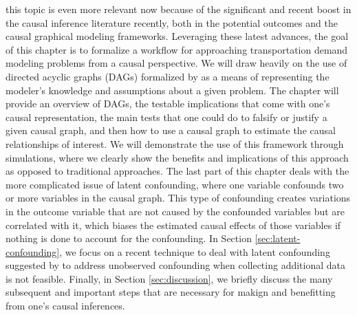 this topic is even more relevant now because of the significant and recent boost in the causal inference literature recently, both in the potential outcomes and the causal graphical modeling frameworks.
Leveraging these latest advances, the goal of this chapter is to formalize a workflow for approaching 
transportation demand modeling problems from a causal perspective. 
We will draw heavily on the use of directed acyclic graphs (DAGs) formalized by \citet{pearl_causality_2000} as a means of representing the modeler's knowledge and assumptions about a given problem. 
The chapter will provide an overview of DAGs, the 
testable implications that come with one's causal representation, the main 
tests that one could do to falsify or justify a given causal graph, and then how 
to use a causal graph to estimate the causal relationships of interest. 
We will demonstrate the use of this framework through simulations, where we 
clearly show the benefits and implications of this approach as opposed to 
traditional approaches. 
The last part of this chapter deals with the more complicated issue of latent 
confounding, where one variable confounds two or more variables in the causal 
graph. This type of confounding creates variations in the outcome variable that are not caused by 
the confounded variables but are correlated with it, which biases the estimated 
causal effects of those variables if nothing is done to account for the 
confounding. 
In Section \ref{sec:latent-confounding}, we focus on a recent technique to deal with latent confounding suggested by \citet{wang_2019_blessings} to address unobserved confounding when collecting additional data is not feasible. 
Finally, in Section \ref{sec:discussion}, we briefly discuss the many subsequent and important steps that are necessary for makign and benefitting from one's causal inferences.
